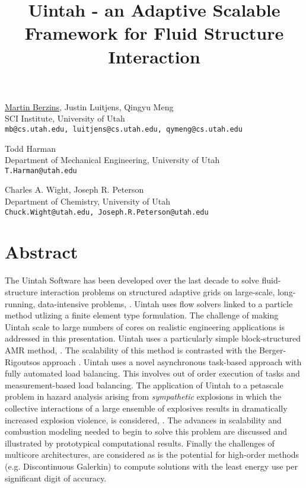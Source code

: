 \title{Uintah - an Adaptive Scalable Framework for Fluid Structure Interaction}
\author{} \institute{}
\maketitle

\begin{center}
\vspace{-6mm}
{\underline{Martin Berzins}, Justin Luitjens, Qingyu Meng}\\
SCI Institute, University of Utah\\
{\tt mb@cs.utah.edu, luitjens@cs.utah.edu,  qymeng@cs.utah.edu}\\
\vspace{4mm}

{\large Todd Harman}\\
Department of Mechanical Engineering, University of Utah\\
{\tt T.Harman@utah.edu}\\
\vspace{4mm}

{\large Charles A. Wight, Joseph R. Peterson}\\
Department of Chemistry, University of Utah\\
{\tt Chuck.Wight@utah.edu, Joseph.R.Peterson@utah.edu}
\end{center}

\section*{Abstract}
The Uintah Software has been developed over the last decade \cite{csafe2} to solve fluid-structure interaction problems on structured adaptive grids on large-scale, long-running, data-intensive problems, \cite{fourthmit}. Uintah uses flow solvers linked to a particle method utlizing a finite element type formulation. The challenge of making Uintah scale to large numbers of cores on realistic engineering applications is addressed in this presentation. Uintah uses a particularly simple block-structured AMR method, \cite{IPDPS10}. The scalability of this method is contrasted with the Berger-Rigoutsos approach \cite{BergerRigoutsos}. Uintah uses a novel asynchronous task-based approach with fully automated load balancing. This involves out of order execution of tasks and measurement-based load balancing. The application of Uintah to a petascale problem in hazard analysis arising from {\it sympathetic} explosions in which the collective interactions of a large ensemble of explosives results in dramatically increased explosion violence, is considered, \cite{Ber2010b}. The advances in scalability and combustion modeling needed to begin to solve this problem are discussed and illustrated by prototypical computational results. Finally the challenges of multicore architectures, are considered as is the potential for high-order methods (e.g. Discontinuous Galerkin) to compute solutions with the least energy use per significant digit of accuracy.

